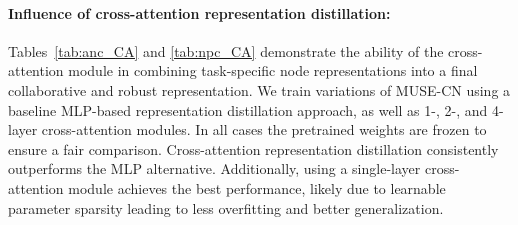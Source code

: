 \documentclass{article}
\begin{document}
\paragraph{Influence of cross-attention representation distillation:} Tables~\ref{tab:anc_CA} and \ref{tab:npc_CA} demonstrate the ability of the cross-attention module in combining task-specific node representations into a final collaborative and robust representation. We train variations of MUSE-CN using a baseline MLP-based representation distillation approach, as well as  1-, 2-, and 4-layer cross-attention modules. In all cases the pretrained weights are frozen to ensure a fair comparison. Cross-attention representation distillation consistently outperforms the MLP alternative. Additionally, using a single-layer cross-attention module achieves the best performance, likely due to learnable parameter sparsity leading to less overfitting and better generalization.
\end{document}
